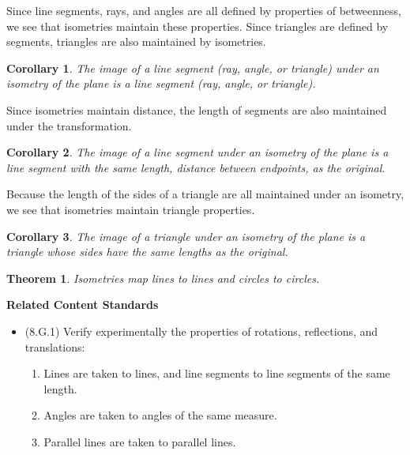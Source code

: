\documentclass[
]{book}
\providecommand{\tightlist}{%
  \setlength{\itemsep}{0pt}\setlength{\parskip}{0pt}}
\newenvironment{standards}{}{}
\newtheorem{theorem}{Theorem}[chapter]
\newtheorem{corollary}{Corollary}[chapter]
\theoremstyle{definition}
\theoremstyle{definition}
\theoremstyle{definition}
\theoremstyle{definition}
\theoremstyle{remark}
\begin{document}
Since line segments, rays, and angles are all defined by properties of betweenness, we see that isometries maintain these properties. Since triangles are defined by segments, triangles are also maintained by isometries.

\begin{corollary}
The image of a line segment (ray, angle, or triangle) under an isometry of the plane is a line segment (ray, angle, or triangle).
\end{corollary}

Since isometries maintain distance, the length of segments are also maintained under the transformation.

\begin{corollary}
The image of a line segment under an isometry of the plane is a line segment with the same length, distance between endpoints, as the original.
\end{corollary}

Because the length of the sides of a triangle are all maintained under an isometry, we see that isometries maintain triangle properties.

\begin{corollary}
The image of a triangle under an isometry of the plane is a triangle whose sides have the same lengths as the original.
\end{corollary}

\begin{theorem}
Isometries map lines to lines and circles to circles.
\end{theorem}

\begin{standards}

\begin{center}
\textbf{Related Content Standards}

\end{center}

\begin{itemize}
\item
  (8.G.1) Verify experimentally the properties of rotations, reflections, and translations:

  \begin{enumerate}
  \def\labelenumi{\alph{enumi}.}
  \tightlist
  \item
    Lines are taken to lines, and line segments to line segments of the same length.
  \item
    Angles are taken to angles of the same measure.
  \item
    Parallel lines are taken to parallel lines.
  \end{enumerate}
\end{itemize}

\end{standards}
\end{document}
